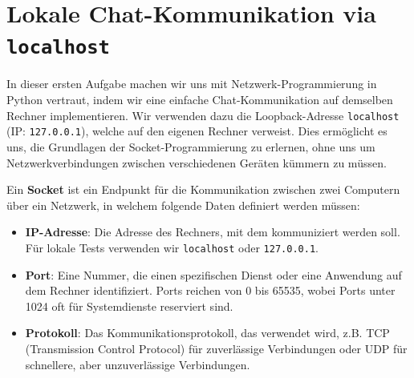 \section{Lokale Chat-Kommunikation via \texorpdfstring{\texttt{localhost}}{localhost}}

In dieser ersten Aufgabe machen wir uns mit Netzwerk-Programmierung in Python vertraut, indem wir eine einfache Chat-Kommunikation auf demselben Rechner implementieren. Wir verwenden dazu die Loopback-Adresse \texttt{localhost} (IP: \texttt{127.0.0.1}), welche auf den eigenen Rechner verweist. Dies ermöglicht es uns, die Grundlagen der Socket-Programmierung zu erlernen, ohne uns um Netzwerkverbindungen zwischen verschiedenen Geräten kümmern zu müssen.

Ein \textbf{Socket} ist ein Endpunkt für die Kommunikation zwischen zwei Computern über ein Netzwerk, in welchem folgende Daten definiert werden müssen:
\begin{itemize}
    \item \textbf{IP-Adresse}: Die Adresse des Rechners, mit dem kommuniziert werden soll. Für lokale Tests verwenden wir \texttt{localhost} oder \texttt{127.0.0.1}.
    \item \textbf{Port}: Eine Nummer, die einen spezifischen Dienst oder eine Anwendung auf dem Rechner identifiziert. Ports reichen von 0 bis 65535, wobei Ports unter 1024 oft für Systemdienste reserviert sind.
    \item \textbf{Protokoll}: Das Kommunikationsprotokoll, das verwendet wird, z.B. \gls{TCP} (Transmission Control Protocol) für zuverlässige Verbindungen oder \gls{UDP} für schnellere, aber unzuverlässige Verbindungen.
\end{itemize}



